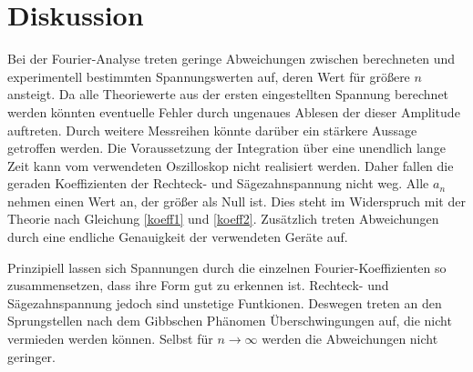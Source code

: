 \section{Diskussion}
\label{sec:Diskussion}

Bei der Fourier-Analyse treten geringe Abweichungen zwischen berechneten und experimentell bestimmten Spannungswerten auf, deren Wert für größere $n$ ansteigt. Da alle Theoriewerte aus der ersten eingestellten Spannung berechnet werden könnten eventuelle Fehler durch ungenaues Ablesen der dieser Amplitude auftreten. Durch weitere Messreihen könnte darüber ein stärkere Aussage getroffen werden.
Die Voraussetzung der Integration über eine unendlich lange Zeit kann vom verwendeten Oszilloskop nicht realisiert werden. Daher fallen die geraden Koeffizienten der Rechteck- und Sägezahnspannung nicht weg. Alle $a_n$ nehmen einen Wert an, der größer als Null ist. Dies steht im Widerspruch mit der Theorie nach Gleichung \eqref{koeff1} und \eqref{koeff2}. Zusätzlich treten Abweichungen durch eine endliche Genauigkeit der verwendeten Geräte auf.

Prinzipiell lassen sich Spannungen durch die einzelnen Fourier-Koeffizienten so zusammensetzen, dass ihre Form gut zu erkennen ist. Rechteck- und Sägezahnspannung jedoch sind unstetige Funtkionen. Deswegen treten an den Sprungstellen nach dem Gibbschen Phänomen Überschwingungen auf, die nicht vermieden werden können. Selbst für $n\to \infty$ werden die Abweichungen nicht geringer.
